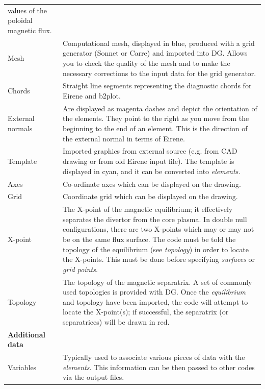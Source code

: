 \documentclass[12pt]{report}
\begin{document}
\begin{supertabular}{lp{300pt}}
values of the poloidal
magnetic flux.
 \\
Mesh
 & 
Computational mesh, displayed in blue, 
produced with a grid generator (Sonnet or 
Carre) and imported into DG.
Allows you to check the quality of the mesh and to
make the necessary corrections to the input data for the grid
generator.
 \\
Chords
 & { 
Straight line segments representing the diagnostic chords for Eirene
and b2plot.
} \\
External normals
& 
Are displayed as magenta dashes and depict the orientation of the elements.
They point 
to the right as you move from the beginning to the end
of an element. This is the direction of the external normal in terms of
Eirene.
 \\
Template
 &  
Imported graphics from external source (e.g. from CAD drawing or from
old Eirene input file). The template is displayed in cyan, and it can
be converted into \textit{elements.}
\\
Axes
 &  
Co-ordinate axes which can be displayed on the drawing.
\\
Grid
 &  
Coordinate grid which can be displayed on the drawing.
\\

X-point
 & 
The X-point of the magnetic equilibrium; it effectively separates the divertor
from the core plasma.  In double null configurations, there are two
X-points which may or may not be on the same flux surface.
The code must be told the topology of the equilibrium (see \textit{topology})
in order to locate the X-points.
This must be done before specifying \textit{surfaces} or 
\textit{grid points}.
 \\
Topology
 &  
The topology of the magnetic separatrix.  A set of commonly used topologies
is provided with DG.  Once the \textit{equilibrium} and topology have been
imported, the code will attempt to locate the X-point(s); if successful, the
separatrix (or separatrices) will be drawn in red.
 \\
\textbf{Additional data}
 &  
~
 \\
 
Variables
 &  
Typically used to associate various pieces of data with the \textit{elements}.
This information can be then passed to 
other codes via the output files.
 \\
 

\end{supertabular}
\end{document}
